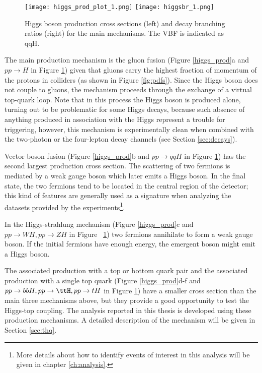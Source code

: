 \begin{figure}[!h]
\centering
\texttt{[image: higgs\_prod\_plot\_1.png]}
\texttt{[image: higgsbr\_1.png]}
\caption[Higgs boson production cross section and decay branching ratios]{Higgs boson production cross sections (left) and decay branching ratios (right) for the main mechanisms. The VBF is indicated as qqH\cite{hcswg}.}
\label{hcs_br}
\end{figure}


The main production mechanism is the gluon fusion (Figure \ref{higgs_prod}a and $pp\to H$ in Figure \ref{hcs_br}) given that gluons carry the highest fraction of momentum of the protons in \pp colliders (as shown in Figure \ref{fig:pdfs}). Since the Higgs boson does not couple to gluons, the mechanism proceeds through the exchange of a virtual top-quark loop. Note that in this process the Higgs boson is produced alone, turning out to be problematic for some Higgs decays, because such absence of anything produced in association with the Higgs represent a trouble for triggering, however, this mechanism is experimentally clean when combined with the two-photon or the four-lepton decay channels (see Section \ref{sec:decays}). 

Vector boson fusion (Figure \ref{higgs_prod}b and $pp\to qqH$ in Figure \ref{hcs_br}) has the second largest production cross section. The scattering of two fermions is mediated by a weak gauge boson which later emits a Higgs boson. In the final state, the two fermions tend to be located in the central region of the detector; this kind of features are generally used as a signature when analyzing the datasets provided by the experiments\footnote{More details about how to identify events of interest in this analysis will be given in chapter \ref{ch:analysis}.}. 

In the Higgs-strahlung mechanism (Figure \ref{higgs_prod}c and ~$pp\to WH, pp\to ZH$ in Figure ~\ref{hcs_br}) two fermions annihilate to form a weak gauge boson. If the initial fermions have enough energy, the emergent boson might emit a Higgs boson.

The associated production with a top or bottom quark pair and the associated production with a single top quark (Figure \ref{higgs_prod}d-f and ~$pp\to bbH, pp\to \ttH, pp\to tH$ in Figure \ref{hcs_br}) have a smaller cross section than the main three mechanisms above, but they provide a good opportunity to test the Higgs-top coupling. The analysis reported in this thesis is developed using these production mechanisms. A detailed description of the \tH mechanism will be given in Section \ref{sec:thq}.  

